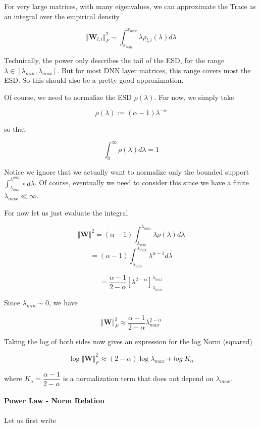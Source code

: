For very large matrices, with many eigenvalues, we can approximate the Trace as an integral over the empirical density

$$\Vert\mathbf{W}_{l,i}\Vert_{F}^{2}\sim\int_{x_{min}}^{x_{max}}\lambda\rho_{l,i}(\lambda)d\lambda$$

Technically, the power only describes the tail of the ESD,  for the range $\lambda\in[\lambda_{min},\lambda_{max}]$.
  But for most DNN layer matrices, this range covers most the ESD.  So this should also be a pretty good approximation.
  
Of course,  we need to normalize the ESD $\rho(\lambda)$. For now, we simply take

$$\rho(\lambda):=(\alpha-1)\lambda^{-\alpha}$$

so that

$$\int_{0}^{\infty}\rho(\lambda)d\lambda=1$$

Notice we ignore that we actually want to normalize only the bounded support  $\int_{\lambda_{min}}^{\lambda^{max}}\circ d\lambda$.
Of course, eventually we need to consider this since we have a finite $\lambda_{max}\ll\infty$.  

For now let us just evaluate the integral

$$\Vert\mathbf{W}\Vert^{2}=(\alpha-1)\int_{\lambda_{min}}^{\lambda_{max}}\lambda\rho(\lambda)d\lambda$$
$$=(\alpha-1)\int_{\lambda_{min}}^{\lambda_{max}}\lambda^{\alpha-1}d\lambda$$

$$=\dfrac{\alpha-1}{2-\alpha}\left[\lambda^{2-\alpha}\right]^{\lambda_{max}}_{\lambda_{min}}$$

Since $\lambda_{min}\sim 0$, we have 

$$\Vert\mathbf{W}\Vert_{F}^{2}\approx\dfrac{\alpha-1}{2-\alpha}\lambda^{2-\alpha}_{max}$$

Taking the log of both sides now gives an expression for the log Norm (squared) 

$$\log\Vert\mathbf{W}\Vert^{2}_{F}\approx(2-\alpha)\log\lambda_{max}+log\;K_{\alpha}$$

where $K_{a}={\dfrac{\alpha-1}{2-\alpha}}$ is a normalization term that does not  depend on $\lambda_{max}$.

\paragraph{Power Law - Norm Relation}


Let us first write

